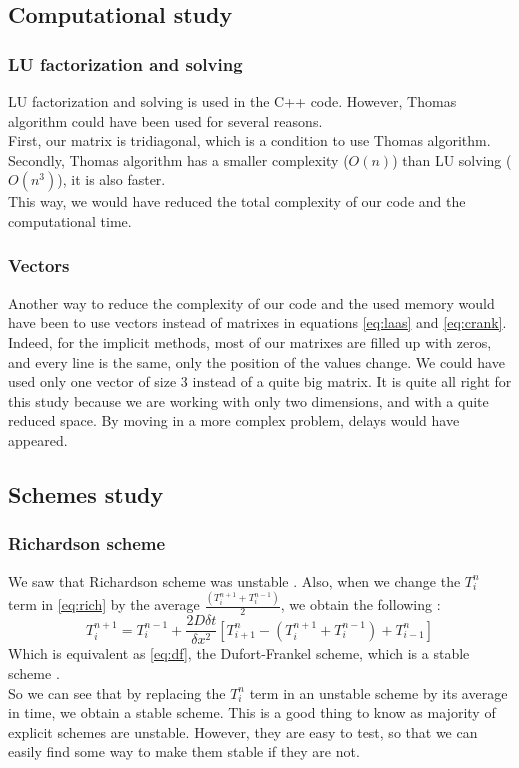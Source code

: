 \documentclass{article}
\begin{document}
        \subsection{Computational study}
            \subsubsection{LU factorization and solving}
                LU factorization and solving is used in the C++ code. However, Thomas algorithm could have been used for several 
                reasons.
                \\
                First, our matrix is tridiagonal, which is a condition to use Thomas algorithm.
                \\
                Secondly, Thomas algorithm has a smaller complexity ($O(n)$) than LU solving ($O(n^3)$), it is also faster.
                \\
                This way, we would have reduced the total complexity of our code and the computational time.
            \subsubsection{Vectors}
                Another way to reduce the complexity of our code and the used memory would have been to use vectors instead
                of matrixes in equations \eqref{eq:laas} and \eqref{eq:crank}. Indeed, for the implicit methods, most of our matrixes are filled up with zeros, and every line is
                the same, only the position of the values change. We could have used only one vector of size 3 instead of a quite big matrix.
                It is quite all right for this study because we are working with only two dimensions, and with a quite reduced space.
                By moving in a more complex problem, delays would have appeared.
        \subsection{Schemes study}
            \subsubsection{Richardson scheme}
                We saw that Richardson scheme was unstable \cite{rich}. Also, when we change the $T_{i}^n$ term
                in \eqref{eq:rich} by the average $\frac{(T_i^{n+1}+T_i^{n-1})}{2}$, we obtain the following :
                \begin{equation}
                    T_i^{n+1} = T_i^{n-1} + \frac{2D\delta t}{\delta x^2}[T_{i+1}^n - (T_i^{n+1}+T_i^{n-1}) + T_{i-1}^n]
                \end{equation}
                Which is equivalent as \eqref{eq:df}, the Dufort-Frankel scheme, which is a stable scheme \cite{df}.
                \\
                So we can see that by replacing the $T_{i}^n$ term in an unstable scheme by its average in time, we obtain 
                a stable scheme. This is a good thing to know as majority of explicit schemes are unstable. However, they are
                easy to test, so that we can easily find some way to make them stable if they are not.
\end{document}
